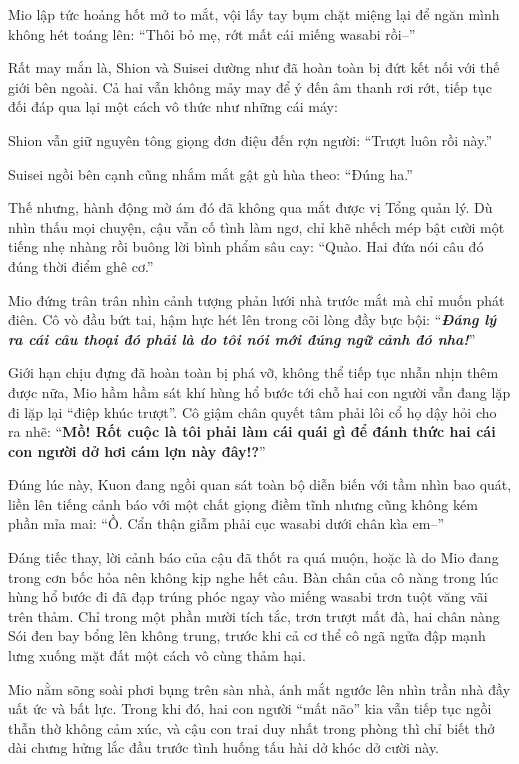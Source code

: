 \documentclass[../main.tex]{subfiles}
\begin{document}
Mio lập tức hoảng hốt mở to mắt, vội lấy tay bụm chặt miệng lại để ngăn mình không hét toáng lên: ``Thôi bỏ mẹ, rớt mất cái miếng wasabi rồi--''

Rất may mắn là, Shion và Suisei dường như đã hoàn toàn bị đứt kết nối với thế giới bên ngoài. Cả hai vẫn không mảy may để ý đến âm thanh rơi rớt, tiếp tục đối đáp qua lại một cách vô thức như những cái máy:

Shion vẫn giữ nguyên tông giọng đơn điệu đến rợn người: ``Trượt luôn rồi này.''

Suisei ngồi bên cạnh cũng nhắm mắt gật gù hùa theo: ``Đúng ha.''

Thế nhưng, hành động mờ ám đó đã không qua mắt được vị Tổng quản lý. Dù nhìn thấu mọi chuyện, cậu vẫn cố tình làm ngơ, chỉ khẽ nhếch mép bật cười một tiếng nhẹ nhàng rồi buông lời bình phẩm sâu cay: ``Quào. Hai đứa nói câu đó đúng thời điểm ghê cơ.''

Mio đứng trân trân nhìn cảnh tượng phản lưới nhà trước mắt mà chỉ muốn phát điên. Cô vò đầu bứt tai, hậm hực hét lên trong cõi lòng đầy bực bội: ``\textit{\textbf{Đáng lý ra cái câu thoại đó phải là do tôi nói mới đúng ngữ cảnh đó nha!}}''

Giới hạn chịu đựng đã hoàn toàn bị phá vỡ, không thể tiếp tục nhẫn nhịn thêm được nữa, Mio hầm hầm sát khí hùng hổ bước tới chỗ hai con người vẫn đang lặp đi lặp lại ``điệp khúc trượt''. Cô giậm chân quyết tâm phải lôi cổ họ dậy hỏi cho ra nhẽ: ``\textbf{Mồ! Rốt cuộc là tôi phải làm cái quái gì để đánh thức hai cái con người dở hơi cám lợn này đây!?}''

Đúng lúc này, Kuon đang ngồi quan sát toàn bộ diễn biến với tầm nhìn bao quát, liền lên tiếng cảnh báo với một chất giọng điềm tĩnh nhưng cũng không kém phần mỉa mai: ``Ồ. Cẩn thận giẫm phải cục wasabi dưới chân kìa em--''

Đáng tiếc thay, lời cảnh báo của cậu đã thốt ra quá muộn, hoặc là do Mio đang trong cơn bốc hỏa nên không kịp nghe hết câu. Bàn chân của cô nàng trong lúc hùng hổ bước đi đã đạp trúng phóc ngay vào miếng wasabi trơn tuột văng vãi trên thảm. Chỉ trong một phần mười tích tắc, trơn trượt mất đà, hai chân nàng Sói đen bay bổng lên không trung, trước khi cả cơ thể cô ngã ngửa đập mạnh lưng xuống mặt đất một cách vô cùng thảm hại.

Mio nằm sõng soài phơi bụng trên sàn nhà, ánh mắt ngước lên nhìn trần nhà đầy uất ức và bất lực. Trong khi đó, hai con người ``mất não'' kia vẫn tiếp tục ngồi thẫn thờ không cảm xúc, và cậu con trai duy nhất trong phòng thì chỉ biết thở dài chưng hửng lắc đầu trước tình huống tấu hài dở khóc dở cười này.
\end{document}
